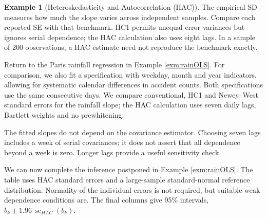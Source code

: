 \documentclass[
  11pt,
]{book}
\theoremstyle{definition}
\theoremstyle{definition}
\newtheorem{example}{Example}[chapter]
\theoremstyle{definition}
\theoremstyle{definition}
\theoremstyle{remark}
\begin{document}
\begin{example}[Heteroskedasticity and Autocorrelation (HAC)]
\begin{table}[H]
\centering\begingroup\fontsize{10}{12}\selectfont

\endgroup{}
\end{table}

The empirical SD measures how much the slope varies across independent samples. Compare each reported SE with that benchmark. HC1 permits unequal error variances but ignores serial dependence; the HAC calculation also uses eight lags. In a sample of 200 observations, a HAC estimate need not reproduce the benchmark exactly.

Return to the Paris rainfall regression in Example \ref{exm:rainOLS}. For comparison, we also fit a specification with weekday, month and year indicators, allowing for systematic calendar differences in accident counts. Both specifications use the same consecutive days. We compare conventional, HC1 and Newey--West standard errors for the rainfall slope; the HAC calculation uses seven daily lags, Bartlett weights and no prewhitening.

\begin{table}[H]
\centering\begingroup\fontsize{10}{12}\selectfont

\endgroup{}
\end{table}

The fitted slopes do not depend on the covariance estimator. Choosing seven lags includes a week of serial covariances; it does not assert that all dependence beyond a week is zero. Longer lags provide a useful sensitivity check.

We can now complete the inference postponed in Example \ref{exm:rainOLS}. The table uses HAC standard errors and a large-sample standard-normal reference distribution. Normality of the individual errors is not required, but suitable weak-dependence conditions are. The final columns give 95\% intervals, \(b_k\pm1.96\,\widehat{\operatorname{se}}_{HAC}(b_k)\).


\end{example}
\end{document}
